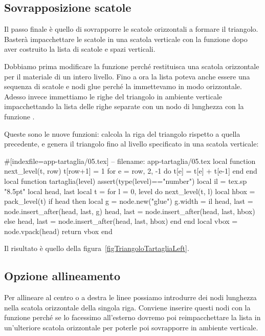 \subsection{Sovrapposizione scatole}

Il passo finale è quello di sovrapporre le scatole orizzontali a formare il
triangolo. Basterà impacchettare le scatole in una scatola verticale con la
funzione  dopo aver costruito la lista di scatole e spazi
verticali.

Dobbiamo prima modificare la funzione  perché restituisca una
scatola orizzontale per il materiale di un intero livello. Fino a ora la lista
poteva anche essere una sequenza di scatole e nodi glue perché la immettevamo in
modo orizzontale. Adesso invece immettiamo le righe del triangolo in ambiente
verticale impacchettando la lista delle righe separate con un nodo di lunghezza
con la funzione .

Queste sono le nuove funzioni:  calcola la riga del triangolo
rispetto a quella precedente, e  genera il triangolo fino al
livello specificato in una scatola verticale:
\begin{lines}
#[indexfile=app-tartaglia/05.tex]
-- filename: app-tartaglia/05.tex
local function next_level(t, row)
    t[row+1] = 1
    for e = row, 2, -1 do
        t[e] = t[e] + t[e-1]
    end
end
local function tartaglia(level)
    assert(type(level)=="number")
    local il = tex.sp "8.5pt"
    local head, last
    local t = {}
    for l = 0, level do
        next_level(t, l)
        local hbox = pack_level(t)
        if head then
            local g = node.new("glue")
            g.width = il
            head, last = node.insert_after(head, last, g)
            head, last = node.insert_after(head, last, hbox)
        else
            head, last = node.insert_after(head, last, hbox)
        end
    end
    local vbox = node.vpack(head)
    return vbox
end
\end{lines}

Il risultato è quello della figura~\ref{figTriangoloTartagliaLeft}.


\subsection{Opzione allineamento}

Per allineare al centro o a destra le linee possiamo introdurre dei nodi
lunghezza nella scatola orizzontale della singola riga. Conviene inserire questi
nodi con la funzione  perché se lo facessimo all'esterno dovremo
poi reimpacchettare la lista in un'ulteriore scatola orizzontale per poterle poi
sovrapporre in ambiente verticale.

